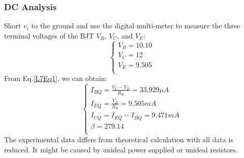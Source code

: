         \subsubsection{DC Analysis}
        Short $v_i$ to the ground and use the digital multi-meter to measure the three terminal voltages of the BJT $V_B$, $V_C$, and $V_E$:\\
            \begin{equation}
                \begin{cases}
                    V_B=10.10\\
                    V_C=12\\
                    V_E=9.505\\
                \end{cases}
            \label{L7Eq1}
            \end{equation}
            From Eq.\ref{L7Eq1}, we can obtain:\\
            \begin{equation}
                \begin{cases}
                    I_{BQ}=\frac{V_C-V_B}{R_B}=33.929\mu A\\
                    I_{EQ}=\frac{V_E}{R_E}=9.505mA\\
                    I_{CQ}=I_{EQ}-I_{BQ}=9.471mA\\
                    \beta=279.14\\
                \end{cases}
            \end{equation}
        The experimental data differs from theoretical calculation with all data is reduced. It might be caused by unideal power supplied or unideal resistors.

